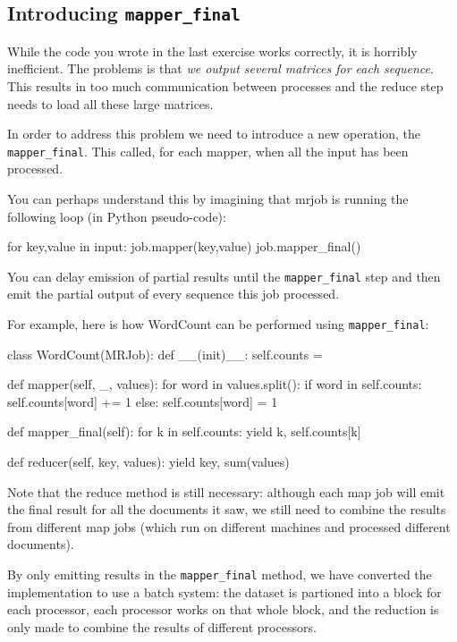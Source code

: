 \subsection{Introducing \texttt{mapper\_final}}

While the code you wrote in the last exercise works correctly, it is horribly
inefficient. The problems is that \emph{we output several matrices for each
sequence}. This results in too much communication between processes and the
reduce step needs to load all these large matrices.

In order to address this problem we need to introduce a new operation, the
\verb+mapper_final+. This called, for each mapper, when all the input has been
processed.

You can perhaps understand this by imagining that mrjob is running the
following loop (in Python pseudo-code):

\begin{python}
for key,value in input:
    job.mapper(key,value)
job.mapper_final()
\end{python}

You can delay emission of partial results until the \verb+mapper_final+ step and
then emit the partial output of every sequence this job processed.

For example, here is how WordCount can be performed using \verb+mapper_final+:

\begin{python}
class WordCount(MRJob):
    def __(init)__:
        self.counts = {}
    
    def mapper(self, _, values):
        for word in values.split():
            if word in self.counts:
                self.counts[word] += 1
            else:
                self.counts[word] = 1

    def mapper_final(self):
        for k in self.counts:
            yield k, self.counts[k]

    def reducer(self, key, values):
        yield key, sum(values)
\end{python}

Note that the reduce method is still necessary: although each map job will emit
the final result for all the documents it saw, we still need to combine the
results from different map jobs (which run on different machines and processed
different documents).

By only emitting results in the \verb+mapper_final+ method, we have converted the
implementation to use a batch system: the dataset is partioned into a block for
each processor, each processor works on that whole block, and the reduction is
only made to combine the results of different processors.

